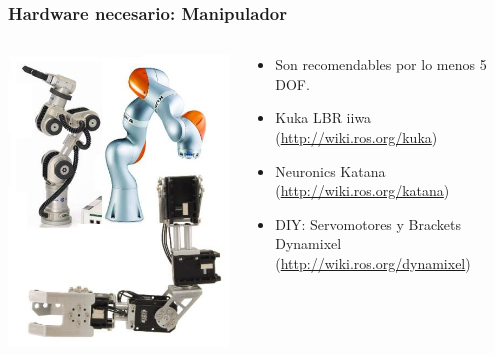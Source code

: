 \begin{frame}\frametitle{Hardware necesario: Manipulador}
  \begin{columns}
    \begin{column}{0.4\textwidth}
      \includegraphics[width=\textwidth]{Figures/arms.jpg}
    \end{column}
    \begin{column}{0.5\textwidth}
      \begin{itemize}
      \item Son recomendables por lo menos 5 DOF.
      \item Kuka LBR iiwa (\url{http://wiki.ros.org/kuka})
      \item Neuronics Katana (\url{http://wiki.ros.org/katana})
      \item DIY: Servomotores y Brackets Dynamixel (\url{http://wiki.ros.org/dynamixel})
      \end{itemize}
    \end{column}
  \end{columns}
\end{frame}
